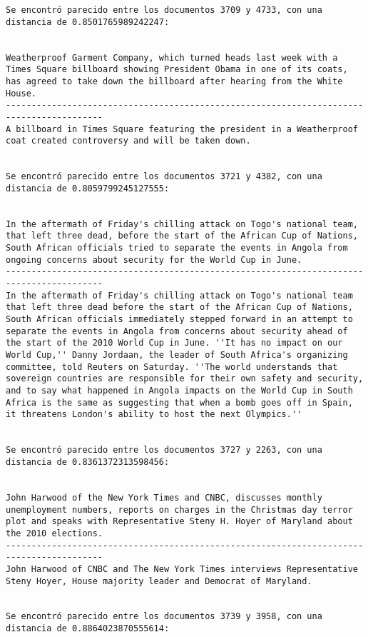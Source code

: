 \documentclass[11pt]{article}
\begin{document}
\begin{Verbatim}[commandchars=\\\{\}]
Se encontró parecido entre los documentos 3709 y 4733, con una distancia de 0.8501765989242247:


Weatherproof Garment Company, which turned heads last week with a Times Square billboard showing President Obama in one of its coats, has agreed to take down the billboard after hearing from the White House.
-----------------------------------------------------------------------------------------
A billboard in Times Square featuring the president in a Weatherproof coat created controversy and will be taken down.


Se encontró parecido entre los documentos 3721 y 4382, con una distancia de 0.8059799245127555:


In the aftermath of Friday's chilling attack on Togo's national team, that left three dead, before the start of the African Cup of Nations, South African officials tried to separate the events in Angola from ongoing concerns about security for the World Cup in June.
-----------------------------------------------------------------------------------------
In the aftermath of Friday's chilling attack on Togo's national team that left three dead before the start of the African Cup of Nations, South African officials immediately stepped forward in an attempt to separate the events in Angola from concerns about security ahead of the start of the 2010 World Cup in June. ''It has no impact on our World Cup,'' Danny Jordaan, the leader of South Africa's organizing committee, told Reuters on Saturday. ''The world understands that sovereign countries are responsible for their own safety and security, and to say what happened in Angola impacts on the World Cup in South Africa is the same as suggesting that when a bomb goes off in Spain, it threatens London's ability to host the next Olympics.''


Se encontró parecido entre los documentos 3727 y 2263, con una distancia de 0.8361372313598456:


John Harwood of the New York Times and CNBC, discusses monthly unemployment numbers, reports on charges in the Christmas day terror plot and speaks with Representative Steny H. Hoyer of Maryland about the 2010 elections. 
-----------------------------------------------------------------------------------------
John Harwood of CNBC and The New York Times interviews Representative Steny Hoyer, House majority leader and Democrat of Maryland.


Se encontró parecido entre los documentos 3739 y 3958, con una distancia de 0.8864023870555614:



\end{Verbatim}
\end{document}
